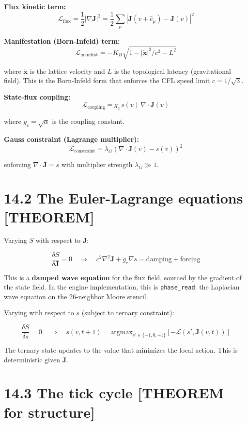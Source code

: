 \documentclass[
  11pt,
  letterpaper,
  twoside,
  openright]{book}
\begin{document}
\textbf{Flux kinetic term:} \[
\mathcal{L}_{\text{flux}} = \frac{1}{2} |\nabla \mathbf{J}|^2 = \frac{1}{2} \sum_{\mu} |\mathbf{J}(v + \hat{e}_\mu) - \mathbf{J}(v)|^2
\tag{14.2}
\]

\textbf{Manifestation (Born-Infeld) term:} \[
\mathcal{L}_{\text{manifest}} = -K_B \sqrt{1 - |\dot{\mathbf{x}}|^2/c^2 - L^2}
\tag{14.3}
\]

where \(\dot{\mathbf{x}}\) is the lattice velocity and \(L\) is the
topological latency (gravitational field). This is the Born-Infeld form
that enforces the CFL speed limit \(c = 1/\sqrt{3}\).

\textbf{State-flux coupling:} \[
\mathcal{L}_{\text{coupling}} = g_c \, s(v) \, \nabla \cdot \mathbf{J}(v)
\tag{14.4}
\]

where \(g_c = \sqrt{\alpha}\) is the coupling constant.

\textbf{Gauss constraint (Lagrange multiplier):} \[
\mathcal{L}_{\text{constraint}} = \lambda_G \left( \nabla \cdot \mathbf{J}(v) - s(v) \right)^2
\tag{14.5}
\]

enforcing \(\nabla \cdot \mathbf{J} = s\) with multiplier strength
\(\lambda_G \gg 1\).

\section{14.2 The Euler-Lagrange equations
{[}THEOREM{]}}\label{the-euler-lagrange-equations-theorem}

Varying \(S\) with respect to \(\mathbf{J}\):

\[
\frac{\delta S}{\delta \mathbf{J}} = 0 \quad \Longrightarrow \quad c^2 \nabla^2 \mathbf{J} + g_c \nabla s = \text{damping} + \text{forcing}
\tag{14.6}
\]

This is a \textbf{damped wave equation} for the flux field, sourced by
the gradient of the state field. In the engine implementation, this is
\texttt{phase\_read}: the Laplacian wave equation on the 26-neighbor
Moore stencil.

Varying with respect to \(s\) (subject to ternary constraint):

\[
\frac{\delta S}{\delta s} = 0 \quad \Longrightarrow \quad s(v, t+1) = \text{argmax}_{s' \in \{-1,0,+1\}} \left[ -\mathcal{L}(s', \mathbf{J}(v,t)) \right]
\tag{14.7}
\]

The ternary state updates to the value that minimizes the local action.
This is deterministic given \(\mathbf{J}\).

\section{14.3 The tick cycle {[}THEOREM for
structure{]}}\label{the-tick-cycle-theorem-for-structure}
\end{document}
